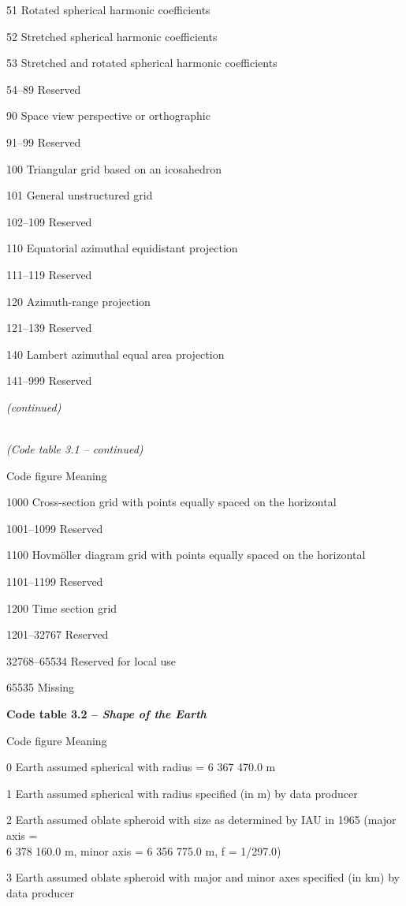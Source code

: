51 Rotated spherical harmonic coefficients

52 Stretched spherical harmonic coefficients

53 Stretched and rotated spherical harmonic coefficients

54--89 Reserved

90 Space view perspective or orthographic

91--99 Reserved

100 Triangular grid based on an icosahedron

101 General unstructured grid

102--109 Reserved

110 Equatorial azimuthal equidistant projection

111--119 Reserved

120 Azimuth-range projection

121--139 Reserved

140 Lambert azimuthal equal area projection

141--999 Reserved

\emph{(continued)}

\emph{\\
(Code table 3.1 -- continued)}

Code figure Meaning

1000 Cross-section grid with points equally spaced on the horizontal

1001--1099 Reserved

1100 Hovmöller diagram grid with points equally spaced on the horizontal

1101--1199 Reserved

1200 Time section grid

1201--32767 Reserved

32768--65534 Reserved for local use

65535 Missing

\textbf{Code table 3.2 -- \emph{Shape of the Earth}}

Code figure Meaning

0 Earth assumed spherical with radius = 6 367 470.0 m

1 Earth assumed spherical with radius specified (in m) by data producer

2 Earth assumed oblate spheroid with size as determined by IAU in 1965 (major axis =\\
6 378 160.0 m, minor axis = 6 356 775.0 m, f = 1/297.0)

3 Earth assumed oblate spheroid with major and minor axes specified (in km) by data producer

